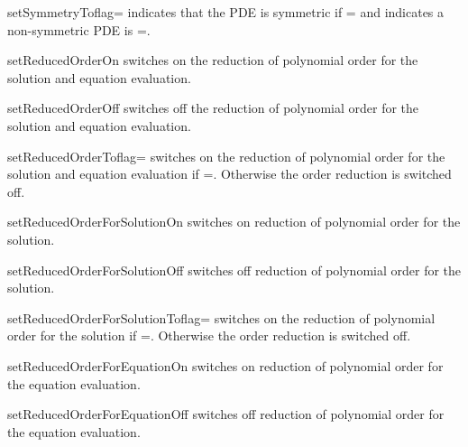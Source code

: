 \begin{methoddesc}[LinearPDE]{setSymmetryTo}{flag=\False}
indicates that the PDE is symmetric if =\True
and indicates a non-symmetric PDE is =\False. 
\end{methoddesc}

\begin{methoddesc}[LinearPDE]{setReducedOrderOn}{}
switches on the reduction of polynomial order for the solution and 
equation evaluation.
\end{methoddesc}

\begin{methoddesc}[LinearPDE]{setReducedOrderOff}{}
switches off the reduction of polynomial order for the solution and 
equation evaluation.
\end{methoddesc}

\begin{methoddesc}[LinearPDE]{setReducedOrderTo}{flag=\False}
switches on the reduction of polynomial order for the solution and 
equation evaluation if =\True. Otherwise
the order reduction is switched off.
\end{methoddesc}

\begin{methoddesc}[LinearPDE]{setReducedOrderForSolutionOn}{}
switches on reduction of polynomial order for the solution.
\end{methoddesc}

\begin{methoddesc}[LinearPDE]{setReducedOrderForSolutionOff}{}
switches off reduction of polynomial order for the solution.
\end{methoddesc}

\begin{methoddesc}[LinearPDE]{setReducedOrderForSolutionTo}{flag=\False}
switches on the reduction of polynomial order for the solution 
if =\True. Otherwise
the order reduction is switched off.
\end{methoddesc}

\begin{methoddesc}[LinearPDE]{setReducedOrderForEquationOn}{}
switches on reduction of polynomial order for the equation evaluation.
\end{methoddesc}

\begin{methoddesc}[LinearPDE]{setReducedOrderForEquationOff}{}
switches off reduction of polynomial order for the equation evaluation.
\end{methoddesc}

